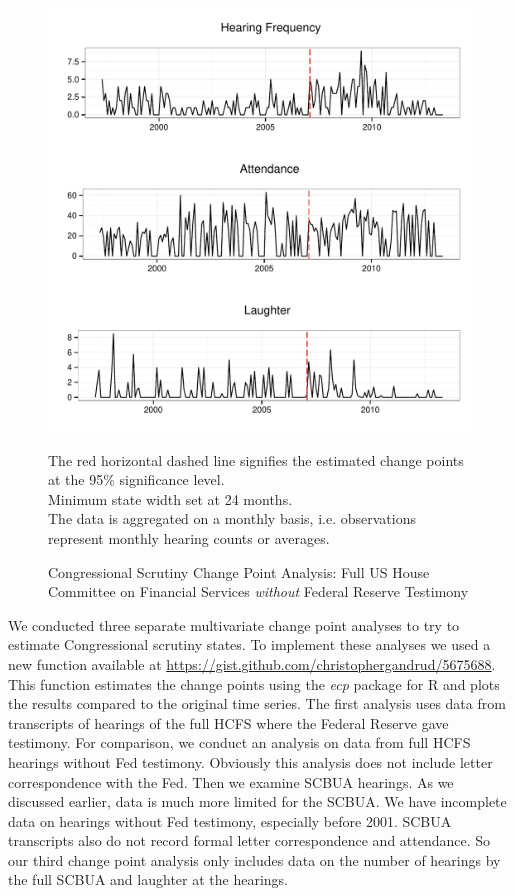 \documentclass[a4paper]{article}\usepackage[]{graphicx}\usepackage[]{color}
\newenvironment{knitrout}{}{} %
\begin{document}
\begin{figure}
    \caption{Congressional Scrutiny Change Point Analysis: Full US House Committee on Financial Services \emph{without} Federal Reserve Testimony}
    \label{fig:BaseNonFedCP}
\begin{knitrout}
\color{fgcolor}

{\centering \includegraphics[width=0.8\linewidth]{figure/ScrutinyNonFedCP} 

}



\end{knitrout}
{\scriptsize{The red horizontal dashed line signifies the estimated change points at the 95\% significance level.\\
Minimum state width set at 24 months. \\
The data is aggregated on a monthly basis, i.e. observations represent monthly hearing counts or averages.}}
\end{figure}

We conducted three separate multivariate change point analyses to try to estimate Congressional scrutiny states. To implement these analyses we used a new function available at \url{https://gist.github.com/christophergandrud/5675688}. This function estimates the change points using the \emph{ecp} \citep{R-ecp} package for R \citep{CiteR} and plots the results compared to the original time series. The first analysis uses data from transcripts of hearings of the full HCFS where the Federal Reserve gave testimony. For comparison, we conduct an analysis on data from full HCFS hearings without Fed testimony. Obviously this analysis does not include letter correspondence with the Fed. Then we examine SCBUA hearings. As we discussed earlier, data is much more limited for the SCBUA. We have incomplete data on hearings without Fed testimony, especially before 2001. SCBUA transcripts also do not record formal letter correspondence and attendance. So our third change point analysis only includes data on the number of hearings by the full SCBUA and laughter at the hearings.
\end{document}
